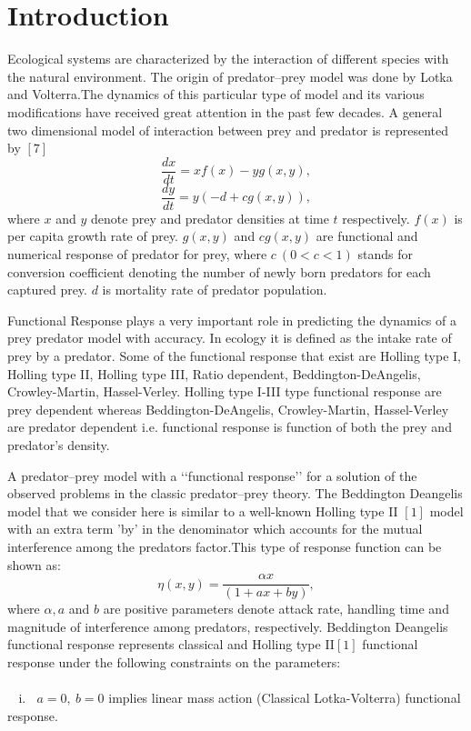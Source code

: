 \documentclass[a4paper, 10pt]{article}
\begin{document}
	\section{Introduction} 	Ecological systems are characterized by the interaction of different species with the natural environment. The origin of predator–prey model was done by Lotka and Volterra.The dynamics of this particular type of model and its various modifications have received great attention in the past few decades. A general two dimensional model of interaction between prey and predator is represented by $[7]$
	\[\frac{dx}{dt}=xf(x)-yg(x,y),\]\[\frac{dy}{dt}=y(-d+cg(x,y)),\]
	where $x$ and $y$ denote prey and predator densities at time $t$ respectively. $f(x)$ is per capita growth rate of prey. $g(x,y)$ and $cg(x,y)$ are functional and numerical response of predator for prey, where $c~(0<c<1)$ stands for conversion coefficient denoting the number of newly born predators for each captured prey. $d$ is mortality rate of predator population. \par
	Functional Response plays a very important role in predicting the dynamics of a prey predator model with accuracy. In ecology it is defined as the intake rate of prey by a predator. Some of the functional response that exist are Holling type I, Holling type II, Holling type III, Ratio dependent, Beddington-DeAngelis, Crowley-Martin, Hassel-Verley. Holling type I-III type functional response are prey dependent whereas Beddington-DeAngelis, Crowley-Martin, Hassel-Verley are predator dependent i.e. functional response is function of both the prey and predator's density.\par
	A predator–prey model with a ‘‘functional response’’ for a solution of the observed problems in the classic predator–prey theory.	The Beddington Deangelis model that we consider here is similar to a well-known Holling type II $[1]$ model with an extra term 'by' in the denominator which accounts for the mutual interference among the predators factor.This type of response function can be shown as:
	\[\eta(x,y)=\frac{\alpha x}{(1+ax+by)},\]
	where $\alpha, a$ and $b$ are positive parameters denote attack rate, handling time and magnitude of interference among predators, respectively. Beddington Deangelis functional response represents classical and Holling type II$[1]$ functional response under the following constraints on the parameters:\\\\
	$~~~~$i.$~~~~	a=0,~b=0$ implies linear mass action (Classical Lotka-Volterra) functional response.\\
\end{document}
